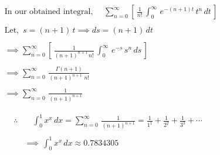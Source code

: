 \documentclass[12pt, a4paper]{article}
\begin{document}
\begin{align*}
    &\text{In our obtained integral, } \quad
    \sum_{n=0}^{\infty} \left[\, \frac{1}{n!} \, \int_{0}^{\infty} \, e^{-(n+1)t}\, t^n \,dt\, \right] \\
    \\&\text{Let, } \, s = (n+1) \, t \implies ds = (n+1)\,dt\\
    \\&\implies \sum_{n=0}^{\infty} \left[\, \frac{1}{(n+1)^{n+1} \, n!} \, \int_{0}^{\infty} \, e^{-s}\, s^n \,ds\, \right] \\
    \\&\implies \sum_{n=0}^{\infty} \, \frac{\Gamma (n+1)}{(n+1)^{n+1} \,\,n!} \\
    \\&\implies \sum_{n=0}^{\infty} \, \frac{1}{(n+1)^{n+1}}
\end{align*}

\begin{align*}
    \therefore & \quad
    \int_{0}^{1} x^x \, dx 
    = \sum_{n=0}^{\infty} \, \frac{1}{(n+1)^{n+1}}
    = \frac{1}{1^1} + \frac{1}{2^2} + \frac{1}{3^3} + \cdots \\
    \\ &\implies \boxed{\, \int_{0}^{1} x^x \, dx \approx 0.7834305 \,}
\end{align*}
\end{document}

